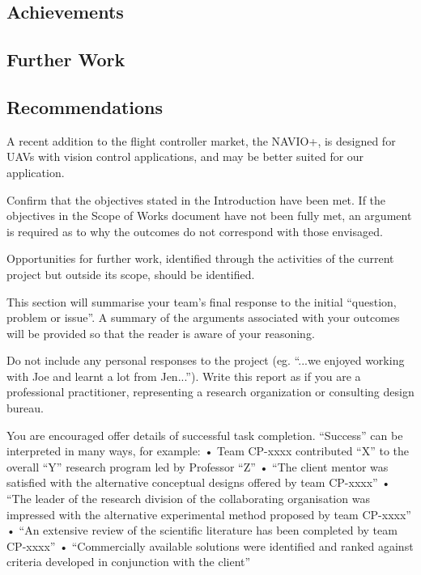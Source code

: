 \subsection{Achievements}


\subsection{Further Work}


\subsection{Recommendations}


 A recent addition to the flight controller market, the NAVIO+\cite{ref:navio}, is designed for UAVs with vision control applications, and may be better suited for our application.

\color{red}
Confirm that the objectives stated in the Introduction have been met. If the objectives in the Scope of Works document have not been fully met, an argument is required as to why the outcomes do not correspond with those envisaged.

Opportunities for further work, identified through the activities of the current project but outside its scope, should be identified.

This section will summarise your team’s final response to the initial “question, problem or issue”.  A summary of the arguments associated with your outcomes will be provided so that the reader is aware of your reasoning.

Do not include any personal responses to the project (eg. “...we enjoyed working with Joe and learnt a lot from Jen...”).  Write this report as if you are a professional practitioner, representing a research organization or consulting design bureau.

You are encouraged offer details of successful task completion. “Success” can be interpreted in many ways, for example: 
•	Team CP-xxxx contributed “X” to the overall “Y” research program led by Professor “Z”
•	“The client mentor was satisfied with the alternative conceptual designs offered by team CP-xxxx”
•	“The leader of the research division of the collaborating organisation was impressed with the alternative experimental method proposed by team CP-xxxx”
•	“An extensive review of the scientific literature has been completed by team CP-xxxx”
•	“Commercially available solutions were identified and ranked against criteria developed in conjunction with the client”

